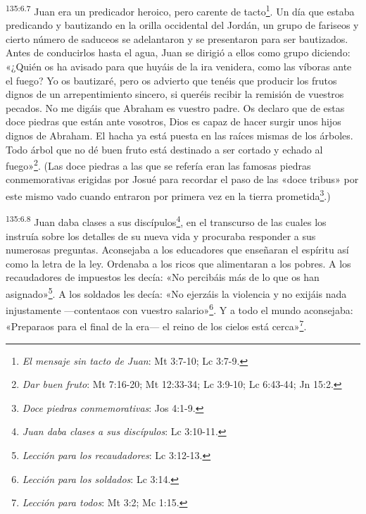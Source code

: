 \par 
\textsuperscript{135:6.7} Juan era un predicador heroico, pero carente de tacto\footnote{\textit{El mensaje sin tacto de Juan}: Mt 3:7-10; Lc 3:7-9.}. Un día que estaba predicando y bautizando en la orilla occidental del Jordán, un grupo de fariseos y cierto número de saduceos se adelantaron y se presentaron para ser bautizados. Antes de conducirlos hasta el agua, Juan se dirigió a ellos como grupo diciendo: «¿Quién os ha avisado para que huyáis de la ira venidera, como las víboras ante el fuego? Yo os bautizaré, pero os advierto que tenéis que producir los frutos dignos de un arrepentimiento sincero, si queréis recibir la remisión de vuestros pecados. No me digáis que Abraham es vuestro padre. Os declaro que de estas doce piedras que están ante vosotros, Dios es capaz de hacer surgir unos hijos dignos de Abraham. El hacha ya está puesta en las raíces mismas de los árboles. Todo árbol que no dé buen fruto está destinado a ser cortado y echado al fuego»\footnote{\textit{Dar buen fruto}: Mt 7:16-20; Mt 12:33-34; Lc 3:9-10; Lc 6:43-44; Jn 15:2.}. (Las doce piedras a las que se refería eran las famosas piedras conmemorativas erigidas por Josué para recordar el paso de las «doce tribus» por este mismo vado cuando entraron por primera vez en la tierra prometida\footnote{\textit{Doce piedras conmemorativas}: Jos 4:1-9.}.)

\par 
\textsuperscript{135:6.8} Juan daba clases a sus discípulos\footnote{\textit{Juan daba clases a sus discípulos}: Lc 3:10-11.}, en el transcurso de las cuales los instruía sobre los detalles de su nueva vida y procuraba responder a sus numerosas preguntas. Aconsejaba a los educadores que enseñaran el espíritu así como la letra de la ley. Ordenaba a los ricos que alimentaran a los pobres. A los recaudadores de impuestos les decía: «No percibáis más de lo que os han asignado»\footnote{\textit{Lección para los recaudadores}: Lc 3:12-13.}. A los soldados les decía: «No ejerzáis la violencia y no exijáis nada injustamente ---contentaos con vuestro salario»\footnote{\textit{Lección para los soldados}: Lc 3:14.}. Y a todo el mundo aconsejaba: «Preparaos para el final de la era--- el reino de los cielos está cerca»\footnote{\textit{Lección para todos}: Mt 3:2; Mc 1:15.}.

